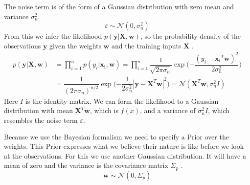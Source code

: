 The noise term is of the form of a Gaussian distribution with zero mean and variance $\sigma_n^2$.
\begin{equation}\label{noise_term}
\varepsilon \sim \mathcal{N}(0,\sigma_n^2)
\end{equation}
From this we infer the likelihood $p(\mathbf{y}|\mathbf{X},\mathbf{w})$, so the probability density of the observations $\mathbf{y}$ given the weights $\mathbf{w}$ and the training inputs $\mathbf{X}$ \citep[p.\ 9]{Rasmussen:2005:GPM:1162254}.
\begin{equation}\label{eq:likelihood}
\begin{aligned}
p(\mathbf{y}|\mathbf{X},\mathbf{w}) &= \prod_{i=1}^{n}p(y_i|\mathbf{x_i},\mathbf{w}) = \prod_{i=1}^{n}\dfrac{1}{\sqrt{2\pi\sigma_n}}\exp\big({-\dfrac{(y_i-\mathbf{x_i}^T\mathbf{w})^2}{2\sigma_n^2}}\big)\\
& = \dfrac{1}{(2\pi\sigma_n)^{n/2}}\exp\big({-\dfrac{1}{2\sigma_n^2}|\mathbf{y}-\mathbf{X}^T\mathbf{w}|^2}\big) = \mathcal{N}(\mathbf{X}^T\mathbf{w},\sigma_n^2I)
\end{aligned}
\end{equation}
Here $I$ is the identity matrix. We can form the likelihood to a Gaussian distribution with mean $\mathbf{X}^T\mathbf{w}$, which is $f(x)$, and a variance of $\sigma_n^2I$, which resembles the noise term $\varepsilon$. 

Because we use the Bayesian formalism we need to specify a \gls{Prior} over the weights. This \gls{Prior} expresses what we believe their nature is like before we look at the observations. For this we use another Gaussian distribution. It will have a mean of zero and the variance is the covariance matrix $\Sigma_p$ \citep[p.\ 9]{Rasmussen:2005:GPM:1162254}.
\begin{equation}\label{eq:weight_prior}
\mathbf{w} \sim \mathcal{N}(0,\Sigma_p)
\end{equation}

